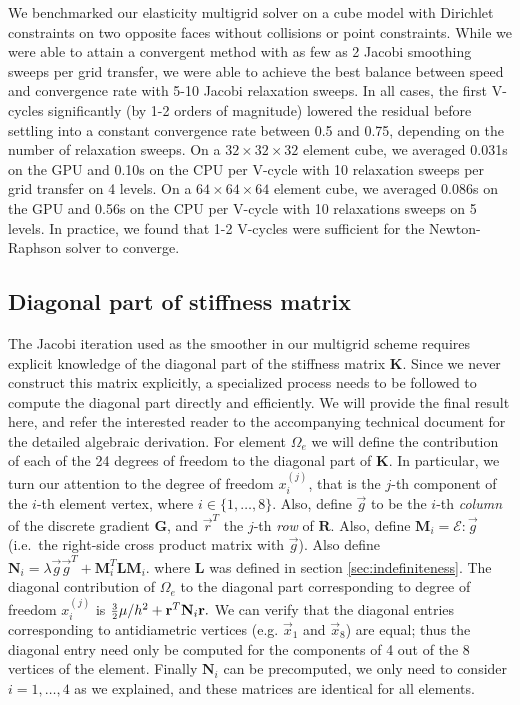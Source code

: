We benchmarked our elasticity multigrid solver on a cube model with Dirichlet constraints on two opposite faces without collisions or point constraints. While we were able to attain a
convergent method with as few as 2 Jacobi smoothing sweeps per grid transfer, we were able to achieve the best balance between speed and convergence rate with 5-10 Jacobi relaxation
sweeps.  In all cases, the first V-cycles significantly (by 1-2 orders of magnitude) lowered the residual before settling into a constant convergence rate between 0.5 and 0.75, depending
on the number of relaxation sweeps.
On a $32\times32\times32$ element cube, we averaged 0.031s on the GPU and 0.10s on the CPU  per V-cycle with 10 relaxation
sweeps per grid transfer on 4 levels.  On a $64\times64\times64$ element cube, we averaged 0.086s on the GPU and 0.56s on the CPU per V-cycle with 10 relaxations sweeps on 5 levels.  In practice, we found that 1-2
V-cycles were sufficient for the Newton-Raphson solver to converge.

\subsection{Diagonal part of stiffness matrix}

The Jacobi iteration used as the smoother in our multigrid scheme requires explicit knowledge of the diagonal part of the stiffness matrix $\mathbf{K}$. Since we never construct this
matrix explicitly, a specialized process needs to be followed to compute the diagonal part directly and efficiently. We will provide the final result here, and refer the interested reader
to the accompanying technical document for the detailed algebraic derivation. For element $\Omega_e$ we will define the contribution of each of the 24 degrees of freedom to the diagonal
part of $\mathbf{K}$. In particular, we turn our attention to the degree of freedom $x_i^{(j)}$, that is the $j$-th component of the $i$-th element vertex, where
$i\in\{1,\ldots,8\}$. Also, define $\vec{g}$ to be the $i$-th \emph{column} of the discrete gradient $\mathbf{G}$, and $\vec{r}^T$ the $j$-th \emph{row} of $\mathbf{R}$. Also, define
$\mathbf{M}_i=\mathcal{E}:\vec{g}$ (i.e.\ the right-side cross product matrix with $\vec{g}$). Also define
$
\mathbf{N}_i=\lambda\vec{g}\vec{g}^T+\mathbf{M}_i^T\mathbf{L}\mathbf{M}_i.
$
where $\mathbf{L}$ was defined in section \ref{sec:indefiniteness}. The diagonal contribution of $\Omega_e$ to the diagonal part corresponding to degree of freedom $x_i^{(j)}$ is
$
\hbox{\small$\frac{3}{2}$}\mu/h^2+\vec{r}^T\mathbf{N}_i\vec{r}.
$
We can verify that the diagonal entries corresponding to antidiametric vertices (e.g. $\vec{x}_1$ and $\vec{x}_8$) are equal; thus the diagonal entry need only be computed for the
components of 4 out of the 8 vertices of the element. Finally $\mathbf{N}_i$ can be precomputed, we only need to consider $i=1,\ldots,4$ as we explained, and these matrices are
identical for all elements. 

